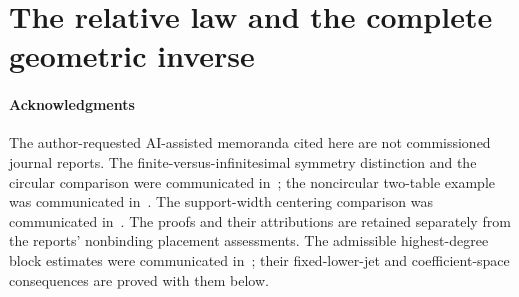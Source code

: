 \maketitle
\enlargethispage{6pt}
\setcounter{tocdepth}{1}
\tableofcontents


\part{The relative law and the complete geometric inverse}
































\subsection*{Acknowledgments}
The author-requested AI-assisted memoranda cited here are not commissioned
journal reports. The finite-versus-infinitesimal symmetry distinction and
the circular comparison were communicated in~\cite{A2ReviewV48}; the
noncircular two-table example was communicated in~\cite{A2ReviewV49}.
The support-width centering comparison was communicated
in~\cite{A2ReviewV51}. The proofs and their attributions are retained
separately from the reports' nonbinding placement assessments.
The admissible highest-degree block estimates were communicated
in~\cite{A2ReviewV57}; their fixed-lower-jet and coefficient-space
consequences are proved with them below.

